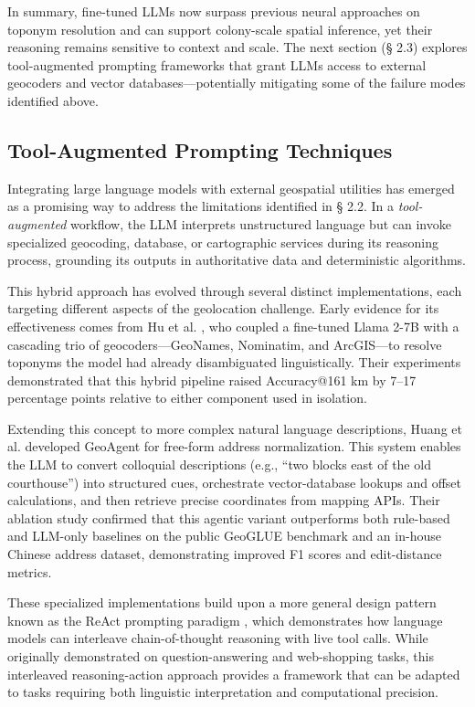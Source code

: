 In summary, fine-tuned LLMs now surpass previous neural approaches on
toponym resolution and can support colony-scale spatial inference, yet
their reasoning remains sensitive to context and scale. The next section
(§ 2.3) explores tool-augmented prompting frameworks that grant LLMs
access to external geocoders and vector databases---potentially
mitigating some of the failure modes identified above.

\subsection{Tool-Augmented Prompting
Techniques}\label{tool-augmented-prompting-techniques}

Integrating large language models with external geospatial utilities has
emerged as a promising way to address the limitations identified in §
2.2. In a \emph{tool-augmented} workflow, the LLM interprets
unstructured language but can invoke specialized geocoding, database, or
cartographic services during its reasoning process, grounding its
outputs in authoritative data and deterministic algorithms.

This hybrid approach has evolved through several distinct
implementations, each targeting different aspects of the geolocation
challenge. Early evidence for its effectiveness comes from Hu et al.
\citep{Hu2024_toponym_llm}, who coupled a fine-tuned Llama 2-7B with a
cascading trio of geocoders---GeoNames, Nominatim, and ArcGIS---to
resolve toponyms the model had already disambiguated linguistically.
Their experiments demonstrated that this hybrid pipeline raised
Accuracy@161 km by 7--17 percentage points relative to either component
used in isolation.

Extending this concept to more complex natural language descriptions,
Huang et al. \citep{Huang2024_geoagent} developed GeoAgent for free-form
address normalization. This system enables the LLM to convert colloquial
descriptions (e.g., ``two blocks east of the old courthouse'') into
structured cues, orchestrate vector-database lookups and offset
calculations, and then retrieve precise coordinates from mapping APIs.
Their ablation study confirmed that this agentic variant outperforms
both rule-based and LLM-only baselines on the public GeoGLUE benchmark
and an in-house Chinese address dataset, demonstrating improved F1
scores and edit-distance metrics.

These specialized implementations build upon a more general design
pattern known as the ReAct prompting paradigm \citep{yao2023react},
which demonstrates how language models can interleave chain-of-thought
reasoning with live tool calls. While originally demonstrated on
question-answering and web-shopping tasks, this interleaved
reasoning-action approach provides a framework that can be adapted to
tasks requiring both linguistic interpretation and computational
precision.


